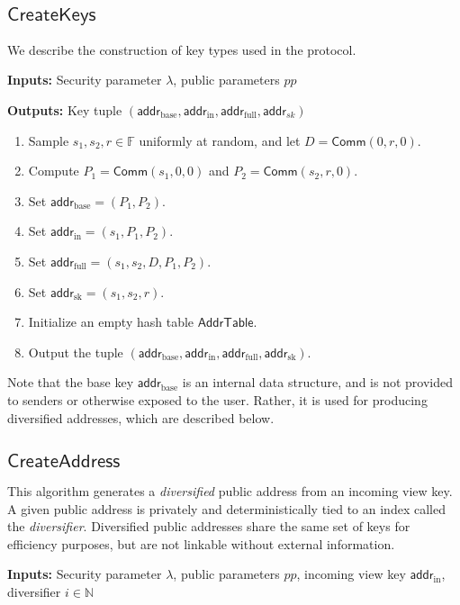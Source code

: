 \documentclass{llncs}
\newcommand{\F}{\mathbb{F}}
\newcommand{\func}[1]{\mathsf{#1}}
\newcommand{\addr}{\func{addr}}
\newcommand{\comm}{\func{Comm}}
\begin{document}
\subsection{\texorpdfstring{$\func{CreateKeys}$}{CreateKeys}}

We describe the construction of key types used in the protocol.

\textbf{Inputs:} Security parameter $\lambda$, public parameters $pp$

\textbf{Outputs:} Key tuple $(\addr_{\text{base}}, \addr_{\text{in}}, \addr_{\text{full}}, \addr_{sk})$

\begin{enumerate}
\item Sample $s_1, s_2, r \in \F$ uniformly at random, and let $D = \comm(0, r, 0)$.
\item Compute $P_1 = \comm(s_1, 0, 0)$ and $P_2 = \comm(s_2, r, 0)$.
\item Set $\addr_{\text{base}} = (P_1, P_2)$.
\item Set $\addr_{\text{in}} = (s_1, P_1, P_2)$.
\item Set $\addr_{\text{full}} = (s_1, s_2, D, P_1, P_2)$.
\item Set $\addr_{\text{sk}} = (s_1, s_2, r)$.
\item Initialize an empty hash table $\func{AddrTable}$.
\item Output the tuple $(\addr_{\text{base}}, \addr_{\text{in}}, \addr_{\text{full}}, \addr_{\text{sk}})$.
\end{enumerate}
Note that the base key $\addr_{\text{base}}$ is an internal data structure, and is not provided to senders or otherwise exposed to the user.
Rather, it is used for producing diversified addresses, which are described below.


\subsection{\texorpdfstring{$\func{CreateAddress}$}{CreateAddress}}

This algorithm generates a \textit{diversified} public address from an incoming view key.
A given public address is privately and deterministically tied to an index called the \textit{diversifier}.
Diversified public addresses share the same set of keys for efficiency purposes, but are not linkable without external information.

\textbf{Inputs:} Security parameter $\lambda$, public parameters $pp$, incoming view key $\addr_{\text{in}}$, diversifier $i \in \mathbb{N}$
\end{document}

